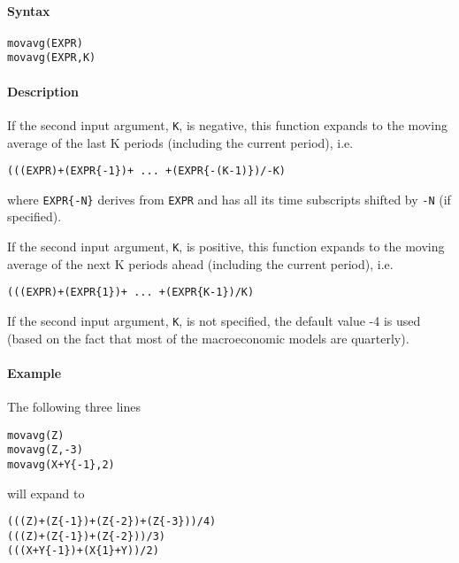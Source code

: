 


	\paragraph{Syntax}\label{syntax}

\begin{verbatim}
movavg(EXPR)
movavg(EXPR,K)
\end{verbatim}

\paragraph{Description}\label{description}

If the second input argument, \texttt{K}, is negative, this function
expands to the moving average of the last K periods (including the
current period), i.e.

\begin{verbatim}
(((EXPR)+(EXPR{-1})+ ... +(EXPR{-(K-1)})/-K)
\end{verbatim}

where \texttt{EXPR\{-N\}} derives from \texttt{EXPR} and has all its
time subscripts shifted by \texttt{-N} (if specified).

If the second input argument, \texttt{K}, is positive, this function
expands to the moving average of the next K periods ahead (including the
current period), i.e.

\begin{verbatim}
(((EXPR)+(EXPR{1})+ ... +(EXPR{K-1})/K)
\end{verbatim}

If the second input argument, \texttt{K}, is not specified, the default
value -4 is used (based on the fact that most of the macroeconomic
models are quarterly).

\paragraph{Example}\label{example}

The following three lines

\begin{verbatim}
movavg(Z)
movavg(Z,-3)
movavg(X+Y{-1},2)
\end{verbatim}

will expand to

\begin{verbatim}
(((Z)+(Z{-1})+(Z{-2})+(Z{-3}))/4)
(((Z)+(Z{-1})+(Z{-2}))/3)
(((X+Y{-1})+(X{1}+Y))/2)
\end{verbatim}


